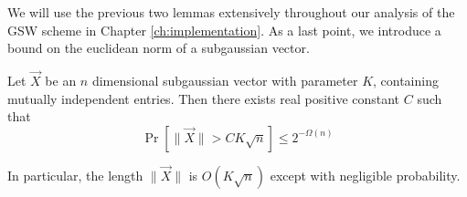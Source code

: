 We will use the previous two lemmas extensively throughout our analysis of the GSW scheme in Chapter \ref{ch:implementation}.
As a last point, we introduce a bound on the euclidean norm of a subgaussian vector.
\begin{theorem}\label{thm:length-subgaussian}
    Let $\vec{X}$ be an $n$ dimensional subgaussian vector with parameter $K$, containing mutually independent entries. Then there exists real positive constant $C$ such that 
    \begin{equation*}
        \operatorname{Pr}[\| \vec{X} \| > CK\sqrt{n}] \leq 2^{-\Omega(n)}
    \end{equation*}
\end{theorem}
In particular, the length $\| \vec{X}\|$ is $O(K\sqrt{n})$ except with negligible probability.


